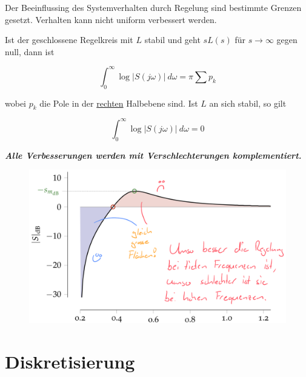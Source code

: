 \documentclass[
  10pt,
  a4paper,
  twocolumn]{article}
\numberwithin{equation}{section}
\begin{document}
Der Beeinflussing des Systemverhalten durch Regelung sind bestimmte
Grenzen gesetzt. Verhalten kann nicht uniform verbessert werden.

\begin{tcolorbox}[enhanced jigsaw, coltitle=black, opacityback=0, leftrule=.75mm, titlerule=0mm, colback=white, breakable, colframe=quarto-callout-note-color-frame, toptitle=1mm, opacitybacktitle=0.6, colbacktitle=quarto-callout-note-color!10!white, left=2mm, bottomtitle=1mm, title=\textcolor{quarto-callout-note-color}{\faInfo}\hspace{0.5em}{Bode's Integral}, arc=.35mm, rightrule=.15mm, bottomrule=.15mm, toprule=.15mm]

Ist der geschlossene Regelkreis mit \(L\) stabil und geht \(sL(s)\) für
\(s\rightarrow\infty\) gegen null, dann ist

\[
\int_0^\infty \log\lvert S(j\omega)\rvert\ d\omega = \pi \sum p_k
\]

wobei \(p_k\) die Pole in der \ul{rechten} Halbebene sind. Ist \(L\) an
sich stabil, so gilt

\[
\int_0^\infty\log\lvert S(j\omega)\rvert\ d\omega = 0
\]

\textbf{\emph{Alle Verbesserungen werden mit Verschlechterungen
komplementiert.}}

\begin{figure}[H]

{\centering \includegraphics{images/paste-81.png}

}

\end{figure}

\end{tcolorbox}

\hypertarget{diskretisierung}{%
\section{Diskretisierung}\label{diskretisierung}}
\end{document}
